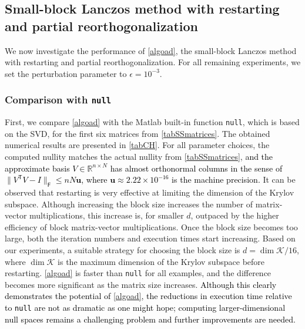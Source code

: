 \documentclass{siamart190516}
\newcommand{\Ttran}{\mathsf{T}}
\newcommand{\fro}{\mathsf{F}}
\newcommand{\R}{\mathbb{R}}
\providecommand{\norm}[1]{\lVert#1\rVert}
\newcommand{\edit}[1]{\textcolor{black}{#1}} %
\newcommand{\redit}[1]{\textcolor{black}{#1}} %
\begin{document}
\subsection{Small-block Lanczos method with restarting and partial reorthogonalization}

We now investigate the performance of \cref{algoad}, the small-block Lanczos method with  restarting and partial reorthogonalization. For all remaining experiments, we set the perturbation parameter to $\epsilon=10^{-3}$. 

\subsubsection{Comparison with \texttt{null}}

First, we compare \cref{algoad} with the Matlab built-in function \texttt{null}, which is based on the SVD, for the first six matrices from \cref{tabSSmatrices}. 
The obtained numerical results are presented in \cref{tabCH}.
For all parameter choices, the computed nullity matches the actual nullity from \cref{tabSSmatrices}, \edit{and the approximate basis $V\in\R^{n\times N}$ has almost orthonormal columns in the sense of $\norm{V^{\Ttran}V-I}_{\fro}\leq nN\mathbf{u}$, where $\mathbf{u}\approx 2.22\times 10^{-16}$ is the machine precision.}
It can be observed that restarting is very effective at limiting the dimension of the Krylov subspace.
Although increasing the block size increases the number of matrix-vector multiplications, this increase is, for smaller $d$, outpaced by the higher efficiency of block matrix-vector 
multiplications.
Once the block size becomes too large, both the iteration numbers and execution times start increasing.
Based on our experiments, a suitable strategy for choosing the block size is $d=\dim \mathcal{K}/16$, where $\dim \mathcal{K}$ is the maximum dimension of the Krylov subspace before restarting. \cref{algoad} is faster than \texttt{null} for all examples, and the difference becomes more significant as the matrix size increases. \redit{Although this clearly demonstrates the potential of \cref{algoad}, the reductions in execution time relative to \texttt{null} are not as dramatic as one might hope; computing larger-dimensional null spaces remains a challenging problem and further improvements are needed.}
\end{document}
